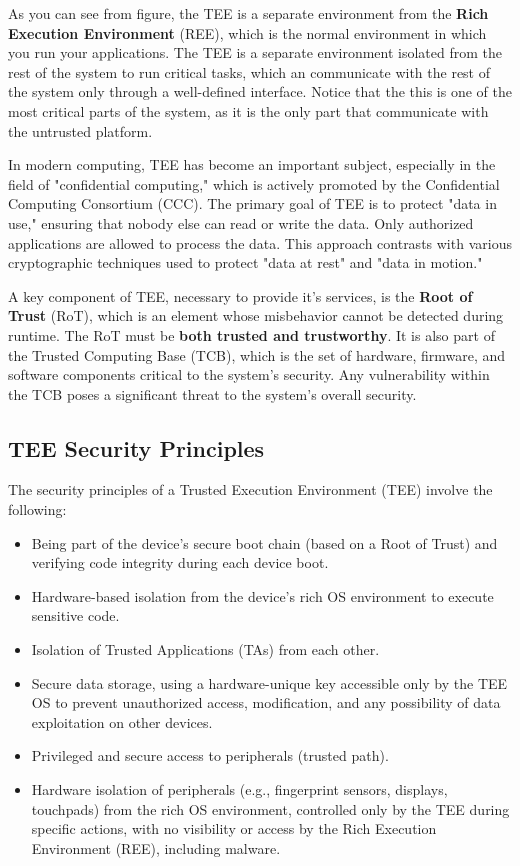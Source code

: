 As you can see from figure, the TEE is a separate environment from the
\textbf{Rich Execution Environment} (REE), which is the normal
environment in which you run your applications. The TEE is a separate
environment isolated from the rest of the system to run critical
tasks, which an communicate with the rest of the system only through a
well-defined interface. Notice that the this is one of the most
critical parts of the system, as it is the only part that communicate
with the untrusted platform.

In modern computing, TEE has become an important subject, especially
in the field of "confidential computing," which is actively promoted
by the Confidential Computing Consortium (CCC). The primary goal of
TEE is to protect "data in use," ensuring that nobody else can read or
write the data. Only authorized applications are allowed to process
the data. This approach contrasts with various cryptographic
techniques used to protect "data at rest" and "data in motion."

A key component of TEE, necessary to provide it's services, is the
\textbf{Root of Trust} (RoT), which is an element whose misbehavior
cannot be detected during runtime. The RoT must be \textbf{both
trusted and trustworthy}. It is also part of the Trusted Computing
Base (TCB), which is the set of hardware, firmware, and software
components critical to the system's security. Any vulnerability within
the TCB poses a significant threat to the system’s overall security.

\subsection{TEE Security Principles}

The security principles of a Trusted Execution Environment 
(TEE) involve the following:

\begin{itemize}
    \item Being part of the device's secure boot chain (based on a Root 
    of Trust) and verifying code integrity during each device boot.
    \item Hardware-based isolation from the device’s rich OS 
    environment to execute sensitive code.
    \item Isolation of Trusted Applications (TAs) from each other.
    \item Secure data storage, using a hardware-unique key accessible 
    only by the TEE OS to prevent unauthorized access, modification, 
    and any possibility of data exploitation on other devices.
    \item Privileged and secure access to peripherals (trusted path).
    \item Hardware isolation of peripherals (e.g., fingerprint sensors, 
    displays, touchpads) from the rich OS environment, controlled 
    only by the TEE during specific actions, with no visibility or 
    access by the Rich Execution Environment (REE), including 
    malware.
\end{itemize}

